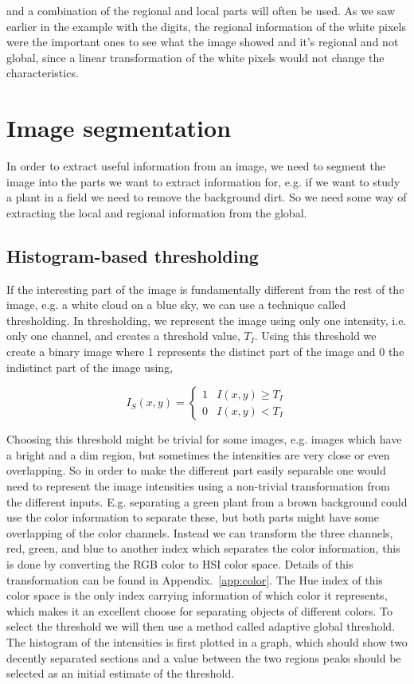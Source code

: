 and a combination of the regional and local parts will often be used. As we saw earlier in the example with the digits, the regional information of the white pixels were the important ones to see what the image showed and it's regional and not global, since a linear transformation of the white pixels would not change the characteristics.

\section{Image segmentation}

In order to extract useful information from an image, we need to segment the image into the parts we want to extract information for, e.g. if we want to study a plant in a field we need to remove the background dirt. So we need some way of extracting the local and regional information from the global.

\subsection{Histogram-based thresholding}

If the interesting part of the image is fundamentally different from the rest of the image, e.g. a white cloud on a blue sky, we can use a technique called thresholding. In thresholding, we represent the image using only one intensity, i.e. only one channel, and creates a threshold value, $T_I$. Using this threshold we create a binary image where 1 represents the distinct part of the image and 0 the indistinct part of the image using,

\begin{equation}
    I_S(x,y)=\left \{ \begin{array}{ll}
    1 & I(x,y) \geq T_I \\
    0 & I(x,y) < T_I
    \end{array} \right.
    \label{eq:thresholding}
\end{equation}

Choosing this threshold might be trivial for some images, e.g. images which have a bright and a dim region, but sometimes the intensities are very close or even overlapping. So in order to make the different part easily separable one would need to represent the image intensities using a non-trivial transformation from the different inputs. E.g. separating a green plant from a brown background could use the color information to separate these, but both parts might have some overlapping of the color channels. Instead we can transform the three channels, red, green, and blue to another index which separates the color information, this is done by converting the RGB color to HSI color space. Details of this transformation can be found in Appendix.~\ref{app:color}. The Hue index of this color space is the only index carrying information of which color it represents, which makes it an excellent choose for separating objects of different colors. To select the threshold we will then use a method called adaptive global threshold. The histogram of the intensities is first plotted in a graph, which should show two decently separated sections and a value between the two regions peaks should be selected as an initial estimate of the threshold.

